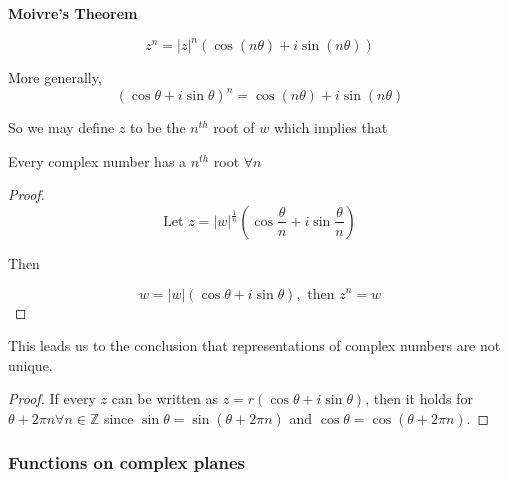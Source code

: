 \documentclass[../notes.tex]{subfiles}
\begin{document}
\begin{theorem}
	\textbf{Moivre's Theorem} 


	\begin{equation}
		z^n = |z|^n (\cos(n\theta) + i \sin(n\theta))
		\label{eq:389:moivre}
	\end{equation}

	More generally, 
	\begin{equation}
		(\cos \theta + i \sin \theta)^n = \cos(n\theta) + i \sin(n\theta)
		\label{eq:389:moivre_thm}
	\end{equation}

	So we may define $ z $ to be the $ n^{th} $ root of $ w $ which implies that 

	\begin{lemma}
		Every complex number has a $ n^{th} $ root $ \forall n $ 
	\end{lemma}

	\begin{proof}

		\begin{equation}
			\text{Let } z = |w|^{\frac{1}{n}}(\cos \frac{\theta}{n} + i \sin \frac{\theta}{n})
		\end{equation}

		Then

		\begin{equation}
			w = |w| (\cos \theta + i \sin \theta), \text{ then  } z^n = w
		\end{equation}
		
	\end{proof}
	
\end{theorem}

This leads us to the conclusion that representations of complex numbers are not unique.
\begin{proof}
	If every $ z $ can be written as $ z = r(\cos\theta + i \sin \theta)$, then it holds for $ \theta + 2\pi n \forall n \in \mathbb{Z} $ since $ \sin\theta = \sin(\theta + 2\pi n) $  and  $  \cos\theta = \cos(\theta + 2\pi n)  $.
\end{proof}

\subsubsection{Functions on complex planes}
\end{document}

